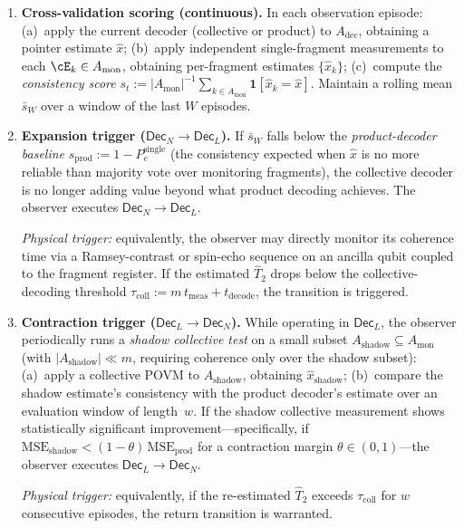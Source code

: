 \begin{enumerate}[leftmargin=2em,label=\textbf{L2.\arabic*}]
\item \textbf{Cross-validation scoring (continuous).}
  In each observation episode:
  (a)~apply the current decoder (collective or product) to
  $A_{\mathrm{dec}}$, obtaining a pointer estimate $\widehat{x}$;
  (b)~apply independent single-fragment measurements to each
  $\cE_k\in A_{\mathrm{mon}}$, obtaining per-fragment estimates
  $\{\widehat{x}_k\}$;
  (c)~compute the \emph{consistency score}
  $s_t := |A_{\mathrm{mon}}|^{-1}\sum_{k\in A_{\mathrm{mon}}}
  \mathbf{1}[\widehat{x}_k = \widehat{x}]$.
  Maintain a rolling mean $\bar{s}_W$ over a window of the last $W$
  episodes.

\item \textbf{Expansion trigger
  ($\mathsf{Dec}_N\to\mathsf{Dec}_L$).}
  If $\bar{s}_W$ falls below the \emph{product-decoder baseline}
  $s_{\mathrm{prod}} := 1-P_e^{\mathrm{single}}$ (the consistency
  expected when $\widehat{x}$ is no more reliable than majority vote
  over monitoring fragments), the collective decoder is no longer adding
  value beyond what product decoding achieves.
  The observer executes
  $\mathsf{Dec}_N\to\mathsf{Dec}_L$.

  \emph{Physical trigger:} equivalently, the observer may directly
  monitor its coherence time via a Ramsey-contrast or spin-echo sequence
  on an ancilla qubit coupled to the fragment register.
  If the estimated $\widehat{T}_2$ drops below the collective-decoding
  threshold $\tau_{\mathrm{coll}}:= m\,t_{\mathrm{meas}}+t_{\mathrm{decode}}$,
  the transition is triggered.

\item \textbf{Contraction trigger
  ($\mathsf{Dec}_L\to\mathsf{Dec}_N$).}
  While operating in $\mathsf{Dec}_L$, the observer periodically runs a
  \emph{shadow collective test} on a small subset
  $A_{\mathrm{shadow}}\subseteq A_{\mathrm{mon}}$
  (with $|A_{\mathrm{shadow}}|\ll m$, requiring coherence only over the
  shadow subset):
  (a)~apply a collective POVM to $A_{\mathrm{shadow}}$, obtaining
  $\widehat{x}_{\mathrm{shadow}}$;
  (b)~compare the shadow estimate's consistency with the product
  decoder's estimate over an evaluation window of length~$w$.
  If the shadow collective measurement shows statistically significant
  improvement---specifically, if
  $\mathrm{MSE}_{\mathrm{shadow}} <
  (1-\theta)\,\mathrm{MSE}_{\mathrm{prod}}$
  for a contraction margin $\theta\in(0,1)$---the observer executes
  $\mathsf{Dec}_L\to\mathsf{Dec}_N$.

  \emph{Physical trigger:} equivalently, if the re-estimated
  $\widehat{T}_2$ exceeds $\tau_{\mathrm{coll}}$ for $w$ consecutive
  episodes, the return transition is warranted.
\end{enumerate}

